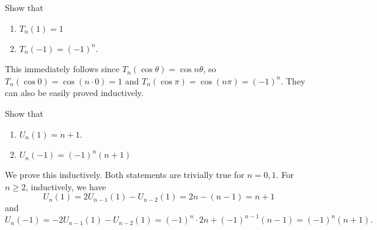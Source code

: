 
		\begin{problem}
			Show that
			\begin{enumerate}[label=(\alph*)]
				\item $T_n(1) = 1$ 
				\item $T_n(-1) = (-1)^n$.
			\end{enumerate}
		\end{problem}
		\begin{solution*}
			This immediately follows since $T_n(\cos\theta) = \cos n\theta$, so $T_n(\cos 0) = \cos (n\cdot 0) = 1$ and $T_n(\cos \pi) = \cos(n\pi) = (-1)^n$. They can also be easily proved inductively.
		\end{solution*}

		\begin{problem}
			Show that
			\begin{enumerate}[label=(\alph*)]
				\item $U_n(1) = n+1$.
				\item $U_n(-1) = (-1)^n (n+1)$
			\end{enumerate}
		\end{problem}
		\begin{solution*}
			We prove this inductively. Both statements are trivially true for $n=0,1$. For $n\ge 2$, inductively, we have
			\[ U_n(1) = 2U_{n-1}(1) - U_{n-2}(1) = 2n - (n-1) = n+1 \]
			and
			\[ U_n(-1) = -2U_{n-1}(1) - U_{n-2}(1) = (-1)^{n} \cdot 2n + (-1)^{n-1} (n-1) = (-1)^n (n+1). \]
		\end{solution*}

